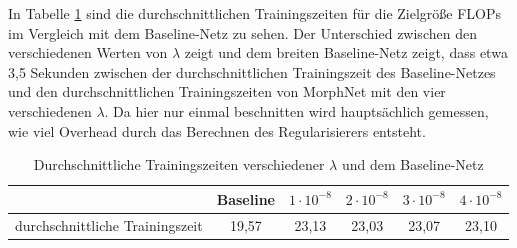 In Tabelle \ref{tab:time} sind die durchschnittlichen Trainingszeiten für die Zielgröße FLOPs im Vergleich mit dem Baseline-Netz zu sehen. Der Unterschied zwischen den verschiedenen Werten von $\lambda$ zeigt und dem breiten Baseline-Netz zeigt, dass etwa 3,5 Sekunden zwischen der durchschnittlichen Trainingszeit des Baseline-Netzes und den durchschnittlichen Trainingszeiten von MorphNet mit den vier verschiedenen $\lambda$. Da hier nur einmal beschnitten wird hauptsächlich gemessen, wie viel Overhead durch das Berechnen des Regularisierers entsteht.
\begin{table}[]
\begin{tabular}{c|c|c|c|c|c|}
\cline{2-6}
                                                      & Baseline & $1\cdot 10^{-8}$   & $2\cdot 10^{-8}$   & $3\cdot 10^{-8}$   & $4\cdot 10^{-8}$   \\ \hline
\multicolumn{1}{|l|}{durchschnittliche Trainingszeit} & 19,57    & 23,13 & 23,03 & 23,07 & 23,10 \\ \hline
\end{tabular}
\caption{Durchschnittliche Trainingszeiten verschiedener $\lambda$ und dem Baseline-Netz}
\label{tab:time}
\end{table}

